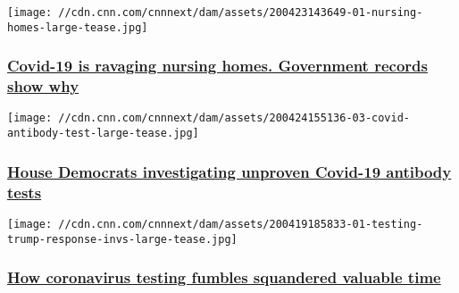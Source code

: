 \href{/2020/04/24/us/nursing-homes-coronavirus-invs/index.html}{}

\texttt{[image: //cdn.cnn.com/cnnnext/dam/assets/200423143649-01-nursing-homes-large-tease.jpg]}

\hypertarget{covid-19-is-ravaging-nursing-homes-government-records-show-why}{%
\subsubsection{\texorpdfstring{\href{/2020/04/24/us/nursing-homes-coronavirus-invs/index.html}{Covid-19
is ravaging nursing homes. Government records show
why}}{Covid-19 is ravaging nursing homes. Government records show why}}\label{covid-19-is-ravaging-nursing-homes-government-records-show-why}}

\href{/2020/04/24/politics/house-oversight-investigating-covid-19-antibody-tests-invs/index.html}{}

\texttt{[image: //cdn.cnn.com/cnnnext/dam/assets/200424155136-03-covid-antibody-test-large-tease.jpg]}

\hypertarget{house-democrats-investigating-unproven-covid-19-antibody-tests}{%
\subsubsection{\texorpdfstring{\href{/2020/04/24/politics/house-oversight-investigating-covid-19-antibody-tests-invs/index.html}{House
Democrats investigating unproven Covid-19 antibody
tests}}{House Democrats investigating unproven Covid-19 antibody tests}}\label{house-democrats-investigating-unproven-covid-19-antibody-tests}}

\href{/2020/04/20/politics/coronavirus-testing-trump-administration-response-invs/index.html}{}

\texttt{[image: //cdn.cnn.com/cnnnext/dam/assets/200419185833-01-testing-trump-response-invs-large-tease.jpg]}

\hypertarget{how-coronavirus-testing-fumbles-squandered-valuable-time}{%
\subsubsection{\texorpdfstring{\href{/2020/04/20/politics/coronavirus-testing-trump-administration-response-invs/index.html}{How
coronavirus testing fumbles squandered valuable
time}}{How coronavirus testing fumbles squandered valuable time}}\label{how-coronavirus-testing-fumbles-squandered-valuable-time}}

\href{/2020/04/17/politics/covid-19-antibody-tests-china/index.html}{}

